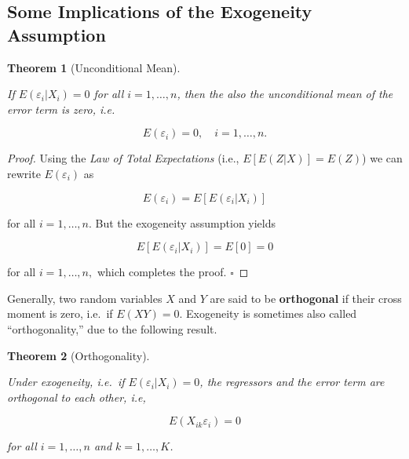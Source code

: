 \documentclass[
  letterpaper,
  DIV=11,
  numbers=noendperiod]{scrreprt}
\theoremstyle{definition}
\theoremstyle{plain}
\newtheorem{theorem}{Theorem}[chapter]
\theoremstyle{plain}
\theoremstyle{remark}
\begin{document}
\hypertarget{some-implications-of-the-exogeneity-assumption}{%
\subsection{Some Implications of the Exogeneity
Assumption}\label{some-implications-of-the-exogeneity-assumption}}

\leavevmode{}%
\begin{theorem}[Unconditional Mean]\label{thm-a}

If \(E(\varepsilon_i|X_i)=0\) for all \(i=1,\dots,n\), then the also the
unconditional mean of the error term is zero, i.e.

\[
E(\varepsilon_i)=0,\quad i=1,\dots,n.
\]

\end{theorem}

\begin{proof}

Using the \emph{Law of Total Expectations} (i.e., \(E[E(Z|X)]=E(Z)\)) we
can rewrite \(E(\varepsilon_i)\) as

\[
E(\varepsilon_i)=E[E(\varepsilon_i|X_i)]
\]

for all \(i=1,\dots,n.\) But the exogeneity assumption yields

\[
E[E(\varepsilon_i|X_i)]=E[0]=0
\]

for all \(i=1,\dots,n,\) which completes the proof. \(\square\)

\end{proof}

Generally, two random variables \(X\) and \(Y\) are said to be
\textbf{orthogonal} if their cross moment is zero, i.e.~if \(E(XY)=0\).
Exogeneity is sometimes also called ``orthogonality,'' due to the
following result.

\leavevmode{}%
\begin{theorem}[Orthogonality]\label{thm-b}

Under exogeneity, i.e.~if \(E(\varepsilon_i|X_{i})=0\), the regressors
and the error term are orthogonal to each other, i.e,

\[
E(X_{ik}\varepsilon_i)=0
\]

for all \(i=1,\dots,n\) and \(k=1,\dots,K\).

\end{theorem}
\end{document}

